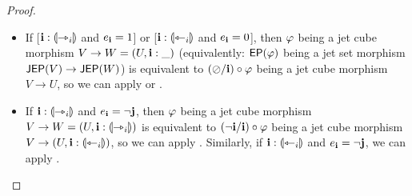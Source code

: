 \documentclass[a4paper]{memoir}
\begin{document}
\begin{proof}
\begin{itemize}
		\item If [$\mathbf{i} : {\llparenthesis \rightarrowtriangle_i \rrparenthesis}$ and $e_{\mathbf{i}} = 1$] or [$\mathbf{i} : {\llparenthesis \leftarrowtriangle_i \rrparenthesis}$ and $e_{\mathbf{i}} = 0$], then $\varphi$ being a jet cube morphism $V \to W = (U, \mathbf{i} : \_)$ (equivalently: $\mathsf{EP}(\varphi)$ being a jet set morphism $\mathsf{JEP}(V) \to \mathsf{JEP}(W)$) is equivalent to $(\oslash / \mathbf{i}) \circ \varphi$ being a jet cube morphism $V \to U$, so we can apply  or .
		
		\item If $\mathbf{i} : {\llparenthesis \rightarrowtriangle_i \rrparenthesis}$ and $e_{\mathbf{i}} = \lnot \mathbf{j}$, then $\varphi$ being a jet cube morphism $V \to W = (U, \mathbf{i} : {\llparenthesis \rightarrowtriangle_i \rrparenthesis})$ is equivalent to $(\lnot \mathbf{i} / \mathbf{i}) \circ \varphi$ being a jet cube morphism $V \to (U, \mathbf{i} : {\llparenthesis \leftarrowtriangle_i \rrparenthesis})$, so we can apply .
		Similarly, if $\mathbf{i} : {\llparenthesis \leftarrowtriangle_i \rrparenthesis}$ and $e_{\mathbf{i}} = \lnot \mathbf{j}$, we can apply .
		

\end{itemize}
\end{proof}
\end{document}

